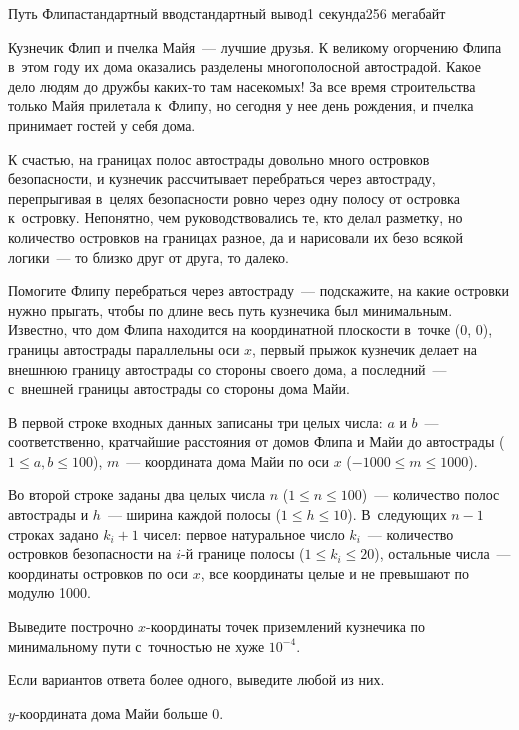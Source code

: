 \begin{problem}{Путь Флипа}{стандартный ввод}{стандартный вывод}{1 секунда}{256 мегабайт}

Кузнечик Флип и пчелка Майя~--- лучшие друзья. К великому огорчению Флипа в~этом году их дома оказались разделены многополосной автострадой. Какое дело людям до дружбы каких-то там насекомых! За все время строительства только Майя прилетала к~Флипу, но сегодня у нее день рождения, и пчелка принимает гостей у себя дома. 

К счастью, на границах полос автострады довольно много островков безопасности, и кузнечик рассчитывает перебраться через автостраду, перепрыгивая в~целях безопасности ровно через одну полосу от островка к~островку. Непонятно, чем руководствовались те, кто делал разметку, но количество островков на границах разное, да и нарисовали их безо всякой логики~--- то близко друг от друга, то далеко.

Помогите Флипу перебраться через автостраду~--- подскажите, на какие островки нужно прыгать, чтобы по длине весь путь кузнечика был минимальным. Известно, что дом Флипа находится на координатной плоскости в~точке (0, 0), границы автострады параллельны оси $x$, первый прыжок кузнечик делает на внешнюю границу автострады со стороны своего дома, а последний~--- с~внешней границы автострады со стороны дома Майи. 

\InputFile
В первой строке входных данных записаны три целых числа: $a$ и $b$~--- соответственно, кратчайшие расстояния от домов Флипа и Майи до автострады ($1 \le a, b \le 100$), $m$~--- координата дома Майи по оси $x$ ($-1000 \le m \le 1000$). 

Во второй строке заданы два целых числа $n$ ($1 \le n \le 100$)~--- количество полос автострады и $h$~--- ширина каждой полосы ($1 \le h \le 10$). В~следующих $n-1$ строках задано $k_i+1$ чисел: первое натуральное число $k_i$~--- количество островков безопасности на $i$-й границе полосы ($1 \le k_i \le 20$), остальные числа~--- координаты островков по оси $x$, все координаты целые и не превышают по модулю 1000. 



\OutputFile
Выведите построчно $x$-координаты точек приземлений кузнечика по минимальному пути с~точностью не хуже $10^{-4}$. 

Если вариантов ответа более одного, выведите любой из них. 

\Example

\begin{example}
%
\end{example}

\Note
$y$-координата дома Майи больше 0.

\end{problem}

